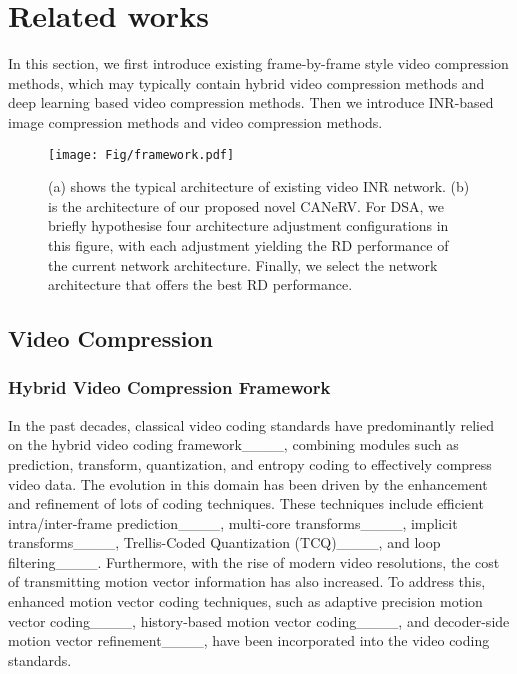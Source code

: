 \section{Related works}
{
In this section, we first introduce existing frame-by-frame style 
video compression methods, which may typically contain hybrid
video compression methods and deep learning based video compression methods. Then we introduce INR-based image compression methods and video compression methods.}

\begin{figure*}[!t]
    \centering
    \texttt{[image: Fig/framework.pdf]}
    \caption{(a) shows the typical architecture of existing video INR network. (b) is the architecture of our proposed novel CANeRV. {For DSA, we briefly hypothesise four architecture adjustment configurations in this figure, with each adjustment yielding the RD performance of the current network architecture. Finally, we select the network architecture that offers the best RD performance.}}
    \label{framework}
\end{figure*}

\subsection{Video Compression} 
\subsubsection{Hybrid Video Compression Framework}
In the past decades, classical video coding standards have predominantly relied on the hybrid video coding framework____, combining modules such as prediction, transform, quantization, and entropy coding to effectively compress video data. The evolution in this domain has been driven by the enhancement and refinement of lots of coding techniques. These techniques include efficient intra/inter-frame prediction____, multi-core transforms____, implicit transforms____, Trellis-Coded Quantization (TCQ)____, and loop filtering____. Furthermore, with the rise of modern video resolutions, the cost of transmitting motion vector information has also increased. To address this, enhanced motion vector coding techniques, such as adaptive precision motion vector coding____, history-based motion vector coding____, and decoder-side motion vector refinement____, have been incorporated into the video coding standards.

